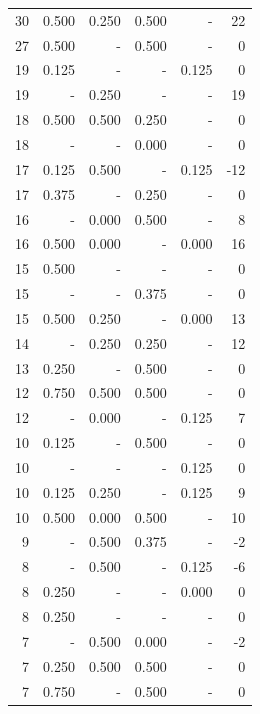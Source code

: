 \documentclass[a4paper]{article}\usepackage[]{graphicx}\usepackage[]{color}
\begin{document}
\begin{table}[ht]
\begin{tabular}{rrrrrr}
   \rowcolor{badColor} 30 & 0.500 & 0.250 & 0.500 & - & 22 \\ 
   \rowcolor{sosoColor} 27 & 0.500 & - & 0.500 & - & 0 \\ 
   \rowcolor{nullColor} 19 & 0.125 & - & - & 0.125 & 0 \\ 
  19 & - & 0.250 & - & - & 19 \\ 
   \rowcolor{badColor} 18 & 0.500 & 0.500 & 0.250 & - & 0 \\ 
   \rowcolor{sosoColor} 18 & - & - & 0.000 & - & 0 \\ 
  17 & 0.125 & 0.500 & - & 0.125 & -12 \\ 
   \rowcolor{sosoColor} 17 & 0.375 & - & 0.250 & - & 0 \\ 
   \rowcolor{badColor} 16 & - & 0.000 & 0.500 & - & 8 \\ 
  16 & 0.500 & 0.000 & - & 0.000 & 16 \\ 
   \rowcolor{nullColor} 15 & 0.500 & - & - & - & 0 \\ 
   \rowcolor{sosoColor} 15 & - & - & 0.375 & - & 0 \\ 
  15 & 0.500 & 0.250 & - & 0.000 & 13 \\ 
   \rowcolor{goodColor} 14 & - & 0.250 & 0.250 & - & 12 \\ 
   \rowcolor{sosoColor} 13 & 0.250 & - & 0.500 & - & 0 \\ 
   \rowcolor{goodColor} 12 & 0.750 & 0.500 & 0.500 & - & 0 \\ 
  12 & - & 0.000 & - & 0.125 & 7 \\ 
   \rowcolor{sosoColor} 10 & 0.125 & - & 0.500 & - & 0 \\ 
   \rowcolor{nullColor} 10 & - & - & - & 0.125 & 0 \\ 
  10 & 0.125 & 0.250 & - & 0.125 & 9 \\ 
   \rowcolor{badColor} 10 & 0.500 & 0.000 & 0.500 & - & 10 \\ 
  9 & - & 0.500 & 0.375 & - & -2 \\ 
  8 & - & 0.500 & - & 0.125 & -6 \\ 
   \rowcolor{nullColor} 8 & 0.250 & - & - & 0.000 & 0 \\ 
   \rowcolor{nullColor} 8 & 0.250 & - & - & - & 0 \\ 
   \rowcolor{badColor} 7 & - & 0.500 & 0.000 & - & -2 \\ 
   \rowcolor{goodColor} 7 & 0.250 & 0.500 & 0.500 & - & 0 \\ 
   \rowcolor{sosoColor} 7 & 0.750 & - & 0.500 & - & 0 \\ 

\end{tabular}
\end{table}
\end{document}
